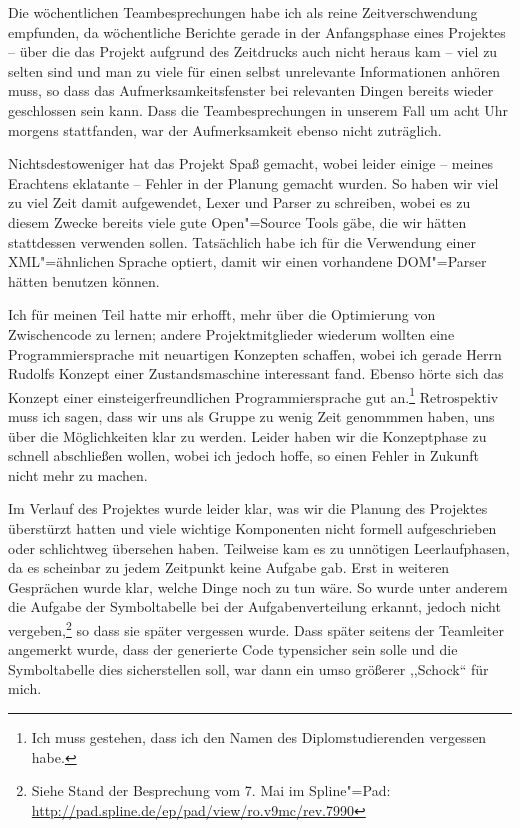 \documentclass[10pt,a4paper,ngerman,titlepage,tocindentauto]{scrartcl}
\newcommand{\link}[1]{\href{#1}{#1}}
\begin{document}
		Die wöchentlichen Teambesprechungen habe ich als reine Zeitverschwendung empfunden, da wöchentliche
		Berichte gerade in der Anfangsphase eines Projektes -- über die das Projekt aufgrund des Zeitdrucks
		auch nicht heraus kam -- viel zu selten sind und man zu viele für einen selbst unrelevante Informationen
		anhören muss, so dass das Aufmerksamkeitsfenster bei relevanten Dingen bereits wieder geschlossen
		sein kann. Dass die Teambesprechungen in unserem Fall um acht Uhr morgens stattfanden, war der Aufmerksamkeit
		ebenso nicht zuträglich.
		
		Nichtsdestoweniger hat das Projekt Spaß gemacht, wobei leider einige -- meines Erachtens eklatante -- Fehler in
		der Planung gemacht wurden. So haben wir viel zu viel Zeit damit aufgewendet, Lexer und Parser zu schreiben, wobei
		es zu diesem Zwecke bereits viele gute Open"=Source Tools gäbe, die wir hätten stattdessen verwenden sollen.
		Tatsächlich habe ich für die Verwendung einer XML"=ähnlichen Sprache optiert, damit wir einen vorhandene
		DOM"=Parser hätten benutzen können.
		
		Ich für meinen Teil hatte mir erhofft, mehr über die Optimierung von Zwischencode zu lernen; andere Projektmitglieder
		wiederum wollten eine Programmiersprache mit neuartigen Konzepten schaffen, wobei ich gerade Herrn Rudolfs Konzept einer
		Zustandsmaschine interessant fand. Ebenso hörte sich das Konzept einer einsteigerfreundlichen Programmiersprache gut an.\footnote
		{Ich muss gestehen, dass ich den Namen des Diplomstudierenden vergessen habe.}
		Retrospektiv muss ich sagen, dass wir uns als Gruppe zu wenig Zeit genommmen haben, uns über die Möglichkeiten
		klar zu werden. Leider haben wir die Konzeptphase zu schnell abschließen wollen, wobei ich jedoch hoffe, so einen
		Fehler in Zukunft nicht mehr zu machen.
		
		Im Verlauf des Projektes wurde leider klar, was wir die Planung des Projektes überstürzt hatten und viele wichtige
		Komponenten nicht formell aufgeschrieben oder schlichtweg übersehen haben. Teilweise kam es zu unnötigen Leerlaufphasen,
		da es scheinbar zu jedem Zeitpunkt keine Aufgabe gab. Erst in weiteren Gesprächen wurde klar, welche Dinge noch zu tun
		wäre. So wurde unter anderem die Aufgabe der Symboltabelle bei der Aufgabenverteilung erkannt, jedoch nicht vergeben,\footnote
		{Siehe Stand der Besprechung vom 7. Mai im Spline"=Pad: \link{http://pad.spline.de/ep/pad/view/ro.v9mc/rev.7990}}
		so dass sie später vergessen wurde. Dass später seitens der Teamleiter angemerkt wurde, dass der generierte Code
		typensicher sein solle und die Symboltabelle dies sicherstellen soll, war dann ein umso größerer ,,Schock`` für mich.
		
\end{document}
